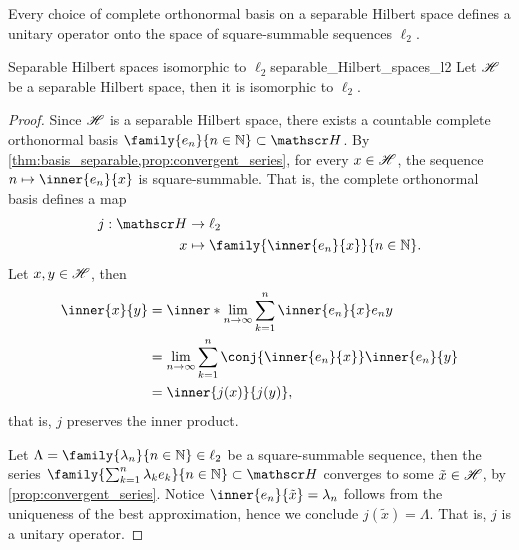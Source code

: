 Every choice of complete orthonormal basis on a separable Hilbert space defines a unitary operator onto the space of square-summable sequences \(\ell_2\).
\begin{theorem}{Separable Hilbert spaces isomorphic to \(\ell_2\)}{separable_Hilbert_spaces_l2}
    Let \(\mathscr{H}\) be a separable Hilbert space, then it is isomorphic to \(\ell_2\).
\end{theorem}
\begin{proof}
    Since \(\mathscr{H}\) is a separable Hilbert space, there exists a countable complete orthonormal basis \(\family{e_n}{n\in \mathbb{N}}\subset \hilbert\). By \cref{thm:basis_separable,prop:convergent_series}, for every \(x \in \mathscr{H}\), the sequence \(n \mapsto \inner{e_n}{x}\) is square-summable. That is, the complete orthonormal basis defines a map
    \begin{align*}
        j : \hilbert &\to \ell_2\\
                   x &\mapsto \family{\inner{e_n}{x}}{n \in \mathbb{N}}.
    \end{align*}
    Let \(x, y \in \mathscr{H}\), then
    \begin{align*}
        \inner{x}{y} &= \inner*{\lim_{n \to \infty}\sum_{k = 1}^n \inner{e_n}{x}e_n}{y}\\
                     &= \lim_{n \to \infty} \sum_{k=1}^n \conj{\inner{e_n}{x}} \inner{e_n}{y}\\
                     &= \inner{j(x)}{j(y)},
    \end{align*}
    that is, \(j\) preserves the inner product.

    Let \(\Lambda = \family{\lambda_n}{n \in \mathbb{N}} \in \ell_2\) be a square-summable sequence, then the series \(\family{\sum_{k = 1}^n \lambda_k e_k}{n \in \mathbb{N}} \subset \hilbert\) converges to some \(\tilde{x} \in \mathscr{H}\), by \cref{prop:convergent_series}. Notice \(\inner{e_n}{\tilde{x}} = \lambda_n\) follows from the uniqueness of the best approximation, hence we conclude \(j(\tilde{x}) = \Lambda\). That is, \(j\) is a unitary operator.
\end{proof}

